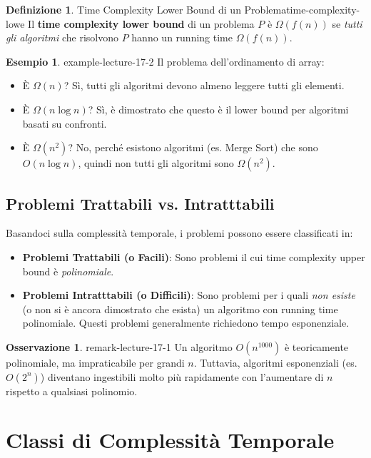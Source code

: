 \documentclass[a4paper]{article}
\theoremstyle{definition} %
\newtheorem{definition}{Definizione}[section]
\newtheorem{remark}[theorem]{Osservazione}
\newtheorem{example}{Esempio}[section]
\begin{document}
\begin{definition}{Time Complexity Lower Bound di un Problema}{time-complexity-lowe}
Il \textbf{time complexity lower bound} di un problema $P$ è $\Omega(f(n))$ se \emph{tutti gli algoritmi} che risolvono $P$ hanno un running time $\Omega(f(n))$.
\end{definition}
\begin{example}{}{{ example-lecture-17-2 }}
Il problema dell'ordinamento di array:
\begin{itemize}
    \item È $\Omega(n)$? Sì, tutti gli algoritmi devono almeno leggere tutti gli elementi.
    \item È $\Omega(n \log n)$? Sì, è dimostrato che questo è il lower bound per algoritmi basati su confronti.
    \item È $\Omega(n^2)$? No, perché esistono algoritmi (es. Merge Sort) che sono $O(n \log n)$, quindi non tutti gli algoritmi sono $\Omega(n^2)$.
\end{itemize}
\end{example}

\subsection{Problemi Trattabili vs. Intratttabili}
Basandoci sulla complessità temporale, i problemi possono essere classificati in:
\begin{itemize}
    \item \textbf{Problemi Trattabili (o Facili)}: Sono problemi il cui time complexity upper bound è \emph{polinomiale}.
    \item \textbf{Problemi Intratttabili (o Difficili)}: Sono problemi per i quali \emph{non esiste} (o non si è ancora dimostrato che esista) un algoritmo con running time polinomiale. Questi problemi generalmente richiedono tempo esponenziale.
\end{itemize}

\begin{remark}{}{{ remark-lecture-17-1 }}
Un algoritmo $O(n^{1000})$ è teoricamente polinomiale, ma impraticabile per grandi $n$. Tuttavia, algoritmi esponenziali (es. $O(2^n)$) diventano ingestibili molto più rapidamente con l'aumentare di $n$ rispetto a qualsiasi polinomio.
\end{remark}

\section{Classi di Complessità Temporale}
\end{document}
